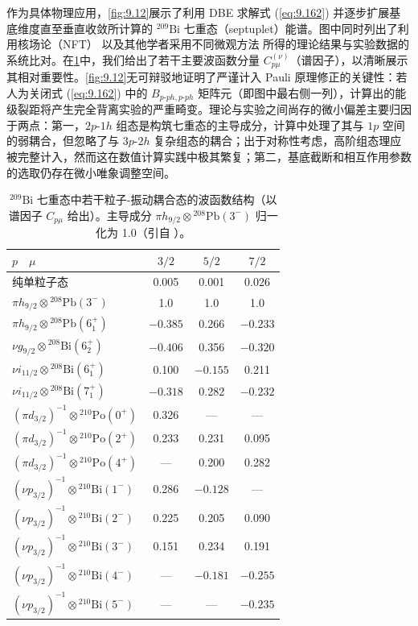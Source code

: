 作为具体物理应用，\ref{fig:9.12}展示了利用 DBE 求解式 (\ref{eq:9.162}) 并逐步扩展基底维度直至垂直收敛所计算的
$^{209}\text{Bi}$ 七重态（septuplet）能谱。图中同时列出了利用核场论（NFT）\cite{BBB77}
以及其他学者采用不同微观方法 \cite{AH71a,Za74b} 所得的理论结果与实验数据的系统比对。在\ref{tab:9.2}中，我们给出了若干主要波函数分量
$C^{(\nu)}_{p\mu}$（谱因子），以清晰展示其相对重要性。\ref{fig:9.12}无可辩驳地证明了严谨计入 Pauli
原理修正的关键性：若人为关闭式 (\ref{eq:9.162}) 中的 $B_{p\text{-}ph,p\text{-}ph}$
矩阵元（即图中最右侧一列），计算出的能级裂距将产生完全背离实验的严重畸变。理论与实验之间尚存的微小偏差主要归因于两点：第一，$2p\text{-}1h$
组态是构筑七重态的主导成分，计算中处理了其与 $1p$ 空间的弱耦合，但忽略了与 $3p\text{-}2h$ 复杂组态的耦合；出于对称性考虑，高阶组态理应被完整计入，然而这在数值计算实践中极其繁复；第二，基底截断和相互作用参数的选取仍存在微小唯象调整空间。

\begin{table}[H]
\caption{\label{tab:9.2}$^{209}\text{Bi}$ 七重态中若干粒子-振动耦合态的波函数结构（以谱因子 $C_{p\mu}$
给出）。主导成分 $\pi h_{9/2}\otimes{}^{208}\text{Pb}(3^{-})$ 归一化为 1.0（引自
\cite{IRS80}）。}

\centering{}%
\begin{tabular}{lccc}
\toprule 
$p\quad\mu$ & $3/2$ & $5/2$ & $7/2$\tabularnewline
\midrule
纯单粒子态 & 0.005 & 0.001 & 0.026\tabularnewline
$\pi h_{9/2}\otimes{}^{208}\text{Pb}(3^{-})$ & 1.0 & 1.0 & 1.0\tabularnewline
$\pi h_{9/2}\otimes{}^{208}\text{Pb}(6^{+}_{1})$ & $-0.385$ & 0.266 & $-0.233$\tabularnewline
$\nu g_{9/2}\otimes{}^{208}\text{Bi}(6^{+}_{2})$ & $-0.406$ & 0.356 & $-0.320$\tabularnewline
$\nu i_{11/2}\otimes{}^{208}\text{Bi}(6^{+}_{1})$ & 0.100 & $-0.155$ & 0.211\tabularnewline
$\nu i_{11/2}\otimes{}^{208}\text{Bi}(7^{+}_{1})$ & $-0.318$ & 0.282 & $-0.232$\tabularnewline
$(\pi d_{3/2})^{-1}\otimes{}^{210}\text{Po}(0^{+})$ & 0.326 & — & —\tabularnewline
$(\pi d_{3/2})^{-1}\otimes{}^{210}\text{Po}(2^{+})$ & 0.233 & 0.231 & 0.095\tabularnewline
$(\pi d_{3/2})^{-1}\otimes{}^{210}\text{Po}(4^{+})$ & — & 0.200 & 0.282\tabularnewline
$(\nu p_{3/2})^{-1}\otimes{}^{210}\text{Bi}(1^{-})$ & 0.286 & $-0.128$ & —\tabularnewline
$(\nu p_{3/2})^{-1}\otimes{}^{210}\text{Bi}(2^{-})$ & 0.225 & 0.205 & 0.090\tabularnewline
$(\nu p_{3/2})^{-1}\otimes{}^{210}\text{Bi}(3^{-})$ & 0.151 & 0.234 & 0.191\tabularnewline
$(\nu p_{3/2})^{-1}\otimes{}^{210}\text{Bi}(4^{-})$ & — & $-0.181$ & $-0.255$\tabularnewline
$(\nu p_{3/2})^{-1}\otimes{}^{210}\text{Bi}(5^{-})$ & — & — & $-0.235$\tabularnewline
\bottomrule
\end{tabular}
\end{table}


